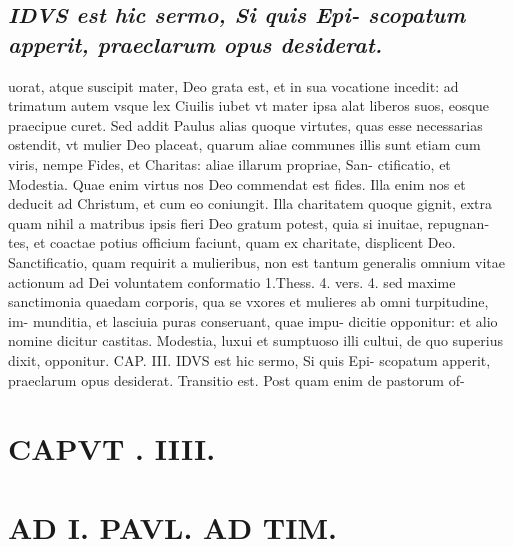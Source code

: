 \documentclass{article}
\begin{document}
\begin{pages}
\subsection*{\textit{IDVS est hic sermo, Si quis Epi- scopatum apperit, praeclarum opus desiderat.}}uorat, atque suscipit mater, Deo grata est, et in sua vocatione incedit: ad trimatum autem vsque lex Ciuilis iubet vt mater ipsa alat liberos suos, eosque praecipue curet. Sed addit Paulus alias quoque virtutes, quas esse necessarias ostendit, vt mulier Deo placeat, quarum aliae communes illis sunt etiam cum viris, nempe Fides, et Charitas: aliae illarum propriae, San- ctificatio, et Modestia. Quae enim virtus nos Deo commendat est fides. Illa enim nos et deducit ad Christum, et cum eo coniungit. Illa charitatem quoque gignit, extra quam nihil a matribus ipsis fieri Deo gratum potest, quia si inuitae, repugnan- tes, et coactae potius officium faciunt, quam ex charitate, displicent Deo. Sanctificatio, quam requirit a mulieribus, non est tantum generalis omnium vitae actionum ad Dei voluntatem conformatio 1.Thess. 4. vers. 4. sed maxime sanctimonia quaedam corporis, qua se vxores et mulieres ab omni turpitudine, im- munditia, et lasciuia puras conseruant, quae impu- dicitie opponitur: et alio nomine dicitur castitas. Modestia, luxui et sumptuoso illi cultui, de quo superius dixit, opponitur. CAP. III. IDVS est hic sermo, Si quis Epi- scopatum apperit, praeclarum opus desiderat. Transitio est. Post quam enim de pastorum of-  \pend
\textbf{}
\section{CAPVT . IIII. }
\section*{AD I. PAVL. AD TIM. }
\marginpar{[ p.180 ]}\pstart {}
{}

\end{pages}
\end{document}

